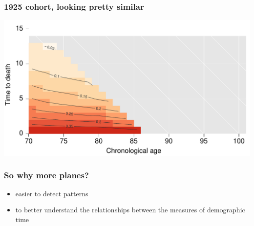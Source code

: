 \documentclass[20pt]{beamer}
\begin{document}
\begin{frame}
\frametitle{1925 cohort, looking pretty similar}
\vspace{-4em}
\begin{center}
\includegraphics[scale=1]{Figures/srhpoor1925.pdf}
\end{center}
\end{frame}


\begin{frame}
\frametitle{So why more planes?}
\normalsize
\begin{itemize}[<+->]
  \item easier to detect patterns
  \item to better understand the relationships between the measures of
  demographic time
\end{itemize}
\end{frame}

\end{document}
